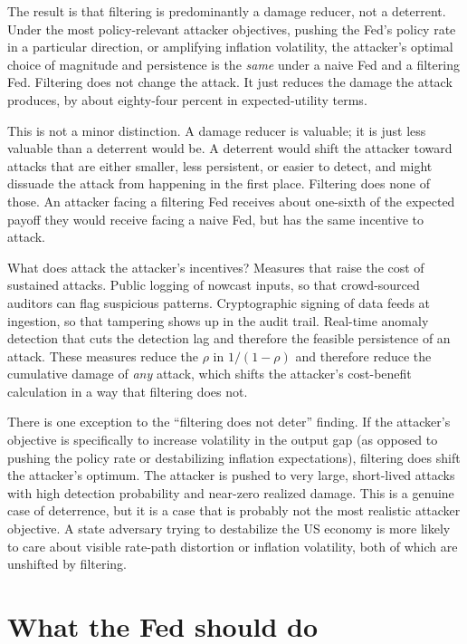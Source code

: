 \documentclass[12pt]{article}
\begin{document}
The result is that filtering is predominantly a damage reducer, not a deterrent. Under the most policy-relevant attacker objectives, pushing the Fed's policy rate in a particular direction, or amplifying inflation volatility, the attacker's optimal choice of magnitude and persistence is the \emph{same} under a naive Fed and a filtering Fed. Filtering does not change the attack. It just reduces the damage the attack produces, by about eighty-four percent in expected-utility terms.

This is not a minor distinction. A damage reducer is valuable; it is just less valuable than a deterrent would be. A deterrent would shift the attacker toward attacks that are either smaller, less persistent, or easier to detect, and might dissuade the attack from happening in the first place. Filtering does none of those. An attacker facing a filtering Fed receives about one-sixth of the expected payoff they would receive facing a naive Fed, but has the same incentive to attack.

What does attack the attacker's incentives? Measures that raise the cost of sustained attacks. Public logging of nowcast inputs, so that crowd-sourced auditors can flag suspicious patterns. Cryptographic signing of data feeds at ingestion, so that tampering shows up in the audit trail. Real-time anomaly detection that cuts the detection lag and therefore the feasible persistence of an attack. These measures reduce the $\rho$ in $1/(1-\rho)$ and therefore reduce the cumulative damage of \emph{any} attack, which shifts the attacker's cost-benefit calculation in a way that filtering does not.

There is one exception to the ``filtering does not deter'' finding. If the attacker's objective is specifically to increase volatility in the output gap (as opposed to pushing the policy rate or destabilizing inflation expectations), filtering does shift the attacker's optimum. The attacker is pushed to very large, short-lived attacks with high detection probability and near-zero realized damage. This is a genuine case of deterrence, but it is a case that is probably not the most realistic attacker objective. A state adversary trying to destabilize the US economy is more likely to care about visible rate-path distortion or inflation volatility, both of which are unshifted by filtering.

\section{What the Fed should do}
\end{document}
